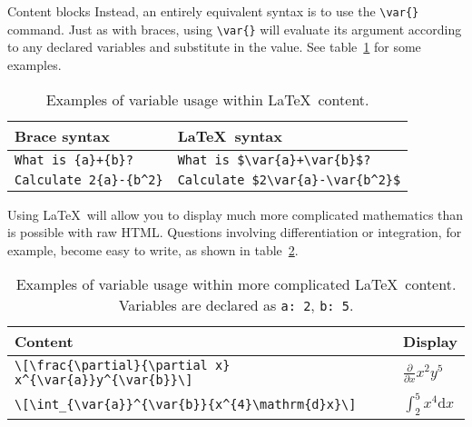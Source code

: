 \begin{chapter}{\label{cha:content_blocks}Content blocks}
  Instead, an entirely equivalent syntax is to use the \verb"\var{}" command.
  Just as with braces, using \verb"\var{}" will evaluate its argument according
  to any declared variables and substitute in the value.  See
  table~\ref{tab:latex_var} for some examples.
  \begin{table}[ht]
    \centering
    \begin{tabular}{ll}
      \hline
      Brace syntax         & \LaTeX\ syntax \\
      \hline
      \verb"What is {a}+{b}?"     & \verb"What is $\var{a}+\var{b}$?" \\
      \verb"Calculate 2{a}-{b^2}" & \verb"Calculate $2\var{a}-\var{b^2}$" \\
      \hline\hline
    \end{tabular}
    \caption{\label{tab:latex_var}
      Examples of variable usage within \LaTeX\ content.
    }
  \end{table}

  Using \LaTeX\ will allow you to display much more complicated mathematics
  than is possible with raw HTML.  Questions involving differentiation or
  integration, for example, become easy to write, as shown in
  table~\ref{tab:more_complicated_latex}.
  \begin{table}[ht]
    \centering
    \begin{tabular}{ll}
      \hline
      Content & Display \\
      \hline
      \rule{0em}{5ex}\verb"\[\frac{\partial}{\partial x} x^{\var{a}}y^{\var{b}}\]" & $\displaystyle{\frac{\partial}{\partial x} x^{2}y^{5}}$ \\[2ex]
      \rule{0em}{5ex}\verb"\[\int_{\var{a}}^{\var{b}}{x^{4}\mathrm{d}x}\]" &
      $\displaystyle{\int_{2}^{5}{x^{4}\mathrm{d}x}}$ \\[2ex]
      \hline\hline
    \end{tabular}
    \caption{\label{tab:more_complicated_latex}
      Examples of variable usage within more complicated \LaTeX\ content.
      Variables are declared as \texttt{a: 2}, \texttt{b: 5}.
    }
  \end{table}


\end{chapter}
